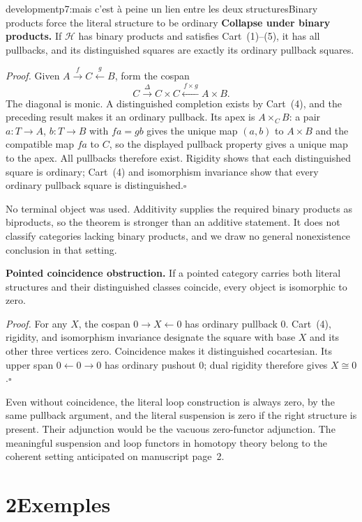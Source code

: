 \begin{dcomment}{development}{p7:mais c'est à peine un lien entre les deux structures}{Binary products force the literal structure to be ordinary}
\textbf{Collapse under binary products.}\ours\quad
If $\mathcal H$ has binary products and satisfies Cart~(1)--(5), it has all pullbacks, and its distinguished squares are exactly its ordinary pullback squares.

\emph{Proof.} Given $A\xrightarrow fC\xleftarrow gB$, form the cospan
\[
C\xrightarrow{\Delta}C\times C
  \xleftarrow{\,f\times g\,}A\times B.
\]
The diagonal is monic. A distinguished completion exists by Cart~(4), and the preceding result makes it an ordinary pullback. Its apex is $A\times_CB$: a pair $a:T\to A$, $b:T\to B$ with $fa=gb$ gives the unique map $(a,b)$ to $A\times B$ and the compatible map $fa$ to $C$, so the displayed pullback property gives a unique map to the apex. All pullbacks therefore exist. Rigidity shows that each distinguished square is ordinary; Cart~(4) and isomorphism invariance show that every ordinary pullback square is distinguished.\hfill$\square$

No terminal object was used. Additivity supplies the required binary products as biproducts, so the theorem is stronger than an additive statement. It does not classify categories lacking binary products, and we draw no general nonexistence conclusion in that setting.

\textbf{Pointed coincidence obstruction.}\ours\quad
If a pointed category carries both literal structures and their distinguished classes coincide, every object is isomorphic to zero.

\emph{Proof.} For any $X$, the cospan $0\to X\leftarrow0$ has ordinary pullback $0$. Cart~(4), rigidity, and isomorphism invariance designate the square with base $X$ and its other three vertices zero. Coincidence makes it distinguished cocartesian. Its upper span $0\leftarrow0\to0$ has ordinary pushout $0$; dual rigidity therefore gives $X\cong0$.\hfill$\square$

Even without coincidence, the literal loop construction is always zero, by the same pullback argument, and the literal suspension is zero if the right structure is present. Their adjunction would be the vacuous zero-functor adjunction. The meaningful suspension and loop functors in homotopy theory belong to the coherent setting anticipated on manuscript page~2.
\end{dcomment}


\section*{2\quad Exemples}

